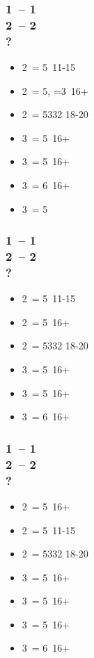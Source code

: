 \documentclass[12pt, a4paper]{article}
\begin{document}
\subsubsection*{1\hearts\ -- 1\spades\ \\ 2\clubs\ -- 2\diams \\ ?}
\begin{itemize}
    \item 2\hearts\ = 5\clubs\ 11-15
    \item 2\spades\ = 5\hearts, =3\spades\ 16+
    \item 2\ntx\ = 5332 18-20
    \item 3\clubs\ = 5\clubs\ 16+
    \item 3\diams\ = 5\diams\ 16+
    \item 3\hearts\ = 6\hearts\ 16+
    \item 3\spades\ = 5\spades\ \gf
\end{itemize}

\subsubsection*{1\hearts\ -- 1\ntx\ \\ 2\clubs\ -- 2\diams \\ ?}
\begin{itemize}
    \item 2\hearts\ = 5\clubs\ 11-15
    \item 2\spades\ = 5\spades\ 16+
    \item 2\ntx\ = 5332 18-20
    \item 3\clubs\ = 5\clubs\ 16+
    \item 3\diams\ = 5\diams\ 16+
    \item 3\hearts\ = 6\hearts\ 16+
\end{itemize}

\subsubsection*{1\spades\ -- 1\ntx\ \\ 2\clubs\ -- 2\diams \\ ?}
\begin{itemize}
    \item 2\hearts\ = 5\hearts\ 16+
    \item 2\spades\ = 5\clubs\ 11-15
    \item 2\ntx\ = 5332 18-20
    \item 3\clubs\ = 5\clubs\ 16+
    \item 3\diams\ = 5\diams\ 16+
    \item 3\hearts\ = 5\hearts\ 16+
    \item 3\spades\ = 6\spades\ 16+
\end{itemize}

\end{document}
